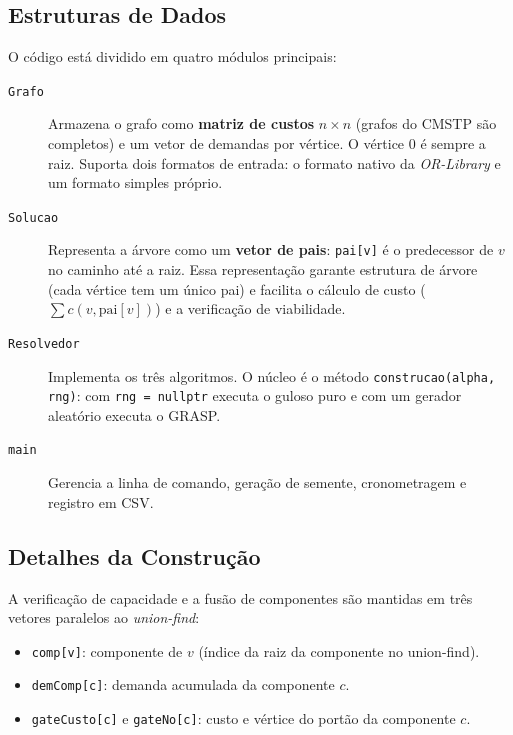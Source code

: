 \documentclass[12pt, a4paper]{article}
\begin{document}
\subsection{Estruturas de Dados}

O código está dividido em quatro módulos principais:

\begin{description}
    \item[\texttt{Grafo}] Armazena o grafo como \textbf{matriz de custos} $n \times n$ (grafos do CMSTP são completos) e um vetor de demandas por vértice. O vértice 0 é sempre a raiz. Suporta dois formatos de entrada: o formato nativo da \textit{OR-Library} e um formato simples próprio.

    \item[\texttt{Solucao}] Representa a árvore como um \textbf{vetor de pais}: \texttt{pai[v]} é o predecessor de $v$ no caminho até a raiz. Essa representação garante estrutura de árvore (cada vértice tem um único pai) e facilita o cálculo de custo ($\sum c(v, \text{pai}[v])$) e a verificação de viabilidade.

    \item[\texttt{Resolvedor}] Implementa os três algoritmos. O núcleo é o método \texttt{construcao(alpha, rng)}: com \texttt{rng = nullptr} executa o guloso puro e com um gerador aleatório executa o GRASP.

    \item[\texttt{main}] Gerencia a linha de comando, geração de semente, cronometragem e registro em CSV.
\end{description}

\subsection{Detalhes da Construção}

A verificação de capacidade e a fusão de componentes são mantidas em três vetores paralelos ao \textit{union-find}:

\begin{itemize}
    \item \texttt{comp[v]}: componente de $v$ (índice da raiz da componente no union-find).
    \item \texttt{demComp[c]}: demanda acumulada da componente $c$.
    \item \texttt{gateCusto[c]} e \texttt{gateNo[c]}: custo e vértice do portão da componente $c$.
\end{itemize}
\end{document}
